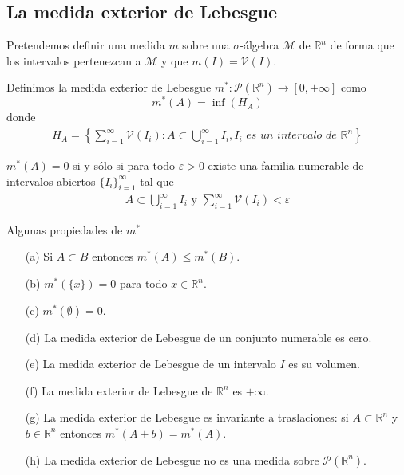\subsection{La medida exterior de Lebesgue}
Pretendemos definir una medida $m$ sobre una $\sigma$-álgebra $\mathcal{M}$ de $\mathbb{R}^n$ de forma que los intervalos pertenezcan a $\mathcal{M}$ y que $m(I) = \mathcal{V}(I)$.
\begin{defi}
    Definimos la medida exterior de Lebesgue $m^*: \mathcal{P}(\mathbb{R}^n) \longrightarrow [0, +\infty]$ como
    $$m^\ast(A) = \inf(H_A)$$
    donde
    \begin{align*}
        H_A = \left\{ \sum_{i=1}^{\infty}{\mathcal{V}(I_i)} : A \subset \bigcup_{i=1}^{\infty}{I_i}, I_i \textit{ es un intervalo de } \mathbb{R}^n \right\}
    \end{align*}
\end{defi}
\begin{obs}
    $m^*(A) = 0$ si y sólo si para todo $\varepsilon > 0$ existe una familia numerable de intervalos abiertos $\{ I_i\}_{i=1}^{\infty}$ tal que
    \begin{align*}
        A \subset \bigcup_{i=1}^{\infty}{I_i} \text{ y } \sum_{i=1}^{\infty}{\mathcal{V}(I_i)} < \varepsilon
    \end{align*}
\end{obs}
\begin{prop}
    Algunas propiedades de $m^*$
    \begin{enumerate}
        \item[(a)] Si $A \subset B$ entonces $m^*(A) \leq m^*(B)$.
        \item[(b)] $m^*(\{ x \}) = 0$ para todo $x \in \mathbb{R}^n$.
        \item[(c)] $m^*(\emptyset) = 0$.
        \item[(d)] La medida exterior de Lebesgue de un conjunto numerable es cero.
        \item[(e)] La medida exterior de Lebesgue de un intervalo $I$ es su volumen.
        \item[(f)] La medida exterior de Lebesgue de $\mathbb{R}^n$ es $+\infty$.
        \item[(g)] La medida exterior de Lebesgue es invariante a traslaciones: si $A \subset \mathbb{R}^n$ y $b \in \mathbb{R}^n$ entonces $m^*(A + b) = m^*(A)$.
        \item[(h)] La medida exterior de Lebesgue no es una medida sobre $\mathcal{P}(\mathbb{R}^n)$.
    \end{enumerate}
\end{prop}
